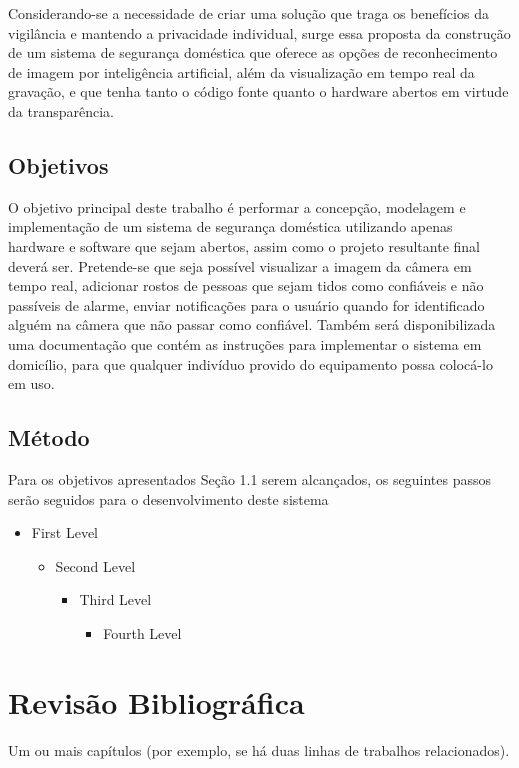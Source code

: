 \documentclass[12pt, %
openright, 
oneside, %
a4paper,    %
brazil]{facom-ufu-abntex2}
\begin{document}
Considerando-se a necessidade de criar uma solução que traga os benefícios da vigilância e mantendo a privacidade individual, surge
essa proposta da construção de um sistema de segurança doméstica que oferece as opções de reconhecimento de imagem
por inteligência artificial, além da visualização em tempo real da gravação, e que tenha tanto o código fonte quanto o hardware
abertos em virtude da transparência.

\section{Objetivos}

O objetivo principal deste trabalho é performar a concepção, modelagem e implementação de um sistema de segurança doméstica utilizando
apenas hardware e software que sejam abertos, assim como o projeto resultante final deverá ser. Pretende-se que seja possível visualizar 
a imagem da câmera em tempo real, adicionar rostos de pessoas que sejam tidos como confiáveis e não passíveis de alarme, enviar notificações
para o usuário quando for identificado alguém na câmera que não passar como confiável. Também será disponibilizada uma documentação que 
contém as instruções para implementar o sistema em domicílio, para que qualquer indivíduo provido do equipamento possa colocá-lo em uso.

\section{Método}

Para os objetivos apresentados Seção 1.1 serem alcançados, os seguintes passos serão seguidos para o desenvolvimento deste sistema

\begin{itemize}
  \item  First Level
  \begin{itemize}
    \item  Second Level
    \begin{itemize}
      \item  Third Level
      \begin{itemize}
        \item  Fourth Level
      \end{itemize}
    \end{itemize}
  \end{itemize}
\end{itemize}


\chapter{Revisão Bibliográfica}
Um ou mais capítulos (por exemplo, se há duas linhas de trabalhos relacionados).
\end{document}
